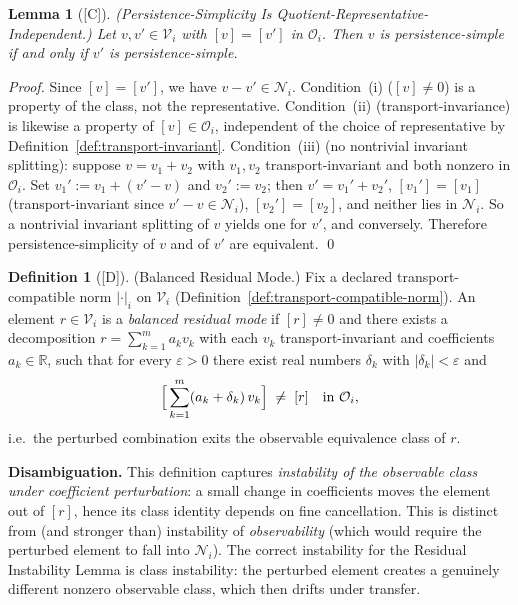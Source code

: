 \documentclass[12pt,oneside]{amsbook}
\theoremstyle{plain}
\newtheorem{lemma}[theorem]{Lemma}
\theoremstyle{definition}
\newtheorem{definition}[theorem]{Definition}
\theoremstyle{remark}
\newcommand{\status}[1]{\textup{[#1]}}
\begin{document}
\begin{lemma}[\status{C}]\label{lem:persistence-simple-quotient-clean}
\textup{(Persistence-Simplicity Is Quotient-Representative-Independent.)}
Let $v, v' \in \mathcal{V}_i$ with $[v] = [v']$ in $\mathcal{O}_i$.
Then $v$ is persistence-simple if and only if $v'$ is
persistence-simple.
\end{lemma}

\begin{proof}
Since $[v]=[v']$, we have $v-v' \in \mathcal{N}_i$.  Condition~(i)
($[v]\neq 0$) is a property of the class, not the representative.
Condition~(ii) (transport-invariance) is likewise a property of
$[v] \in \mathcal{O}_i$, independent of the choice of representative
by Definition~\ref{def:transport-invariant}.  Condition~(iii) (no
nontrivial invariant splitting): suppose $v = v_1 + v_2$ with $v_1,
v_2$ transport-invariant and both nonzero in $\mathcal{O}_i$.  Set
$v_1' := v_1 + (v'-v)$ and $v_2' := v_2$; then $v' = v_1' + v_2'$,
$[v_1']=[v_1]$ (transport-invariant since $v'-v \in \mathcal{N}_i$),
$[v_2']=[v_2]$, and neither lies in $\mathcal{N}_i$.  So a nontrivial
invariant splitting of $v$ yields one for $v'$, and conversely.
Therefore persistence-simplicity of $v$ and of $v'$ are equivalent.
\qed
\end{proof}

\begin{definition}[\status{D}]\label{def:balanced-residual}
\textup{(Balanced Residual Mode.)}
Fix a declared transport-compatible norm $|\cdot|_i$ on
$\mathcal{V}_i$ (Definition~\ref{def:transport-compatible-norm}).
An element $r \in \mathcal{V}_i$ is a \emph{balanced residual mode}
if $[r] \neq 0$ and there exists a decomposition
$r = \sum_{k=1}^m a_k v_k$ with each $v_k$ transport-invariant and
coefficients $a_k \in \mathbb{R}$, such that for every $\varepsilon > 0$
there exist real numbers $\delta_k$ with $|\delta_k| < \varepsilon$ and
\[
  \Bigl[\,\sum_{k=1}^m (a_k + \delta_k)\, v_k\Bigr] \;\neq\; [r]
  \quad \text{in } \mathcal{O}_i,
\]
i.e.\ the perturbed combination exits the observable equivalence
class of $r$.

\textbf{Disambiguation.}  This definition captures
\emph{instability of the observable class under coefficient
perturbation}: a small change in coefficients moves the element out
of $[r]$, hence its class identity depends on fine cancellation.
This is distinct from (and stronger than) instability of
\emph{observability} (which would require the perturbed element to
fall into $\mathcal{N}_i$).  The correct instability for the
Residual Instability Lemma is class instability: the perturbed
element creates a genuinely different nonzero observable class,
which then drifts under transfer.
\end{definition}
\end{document}
